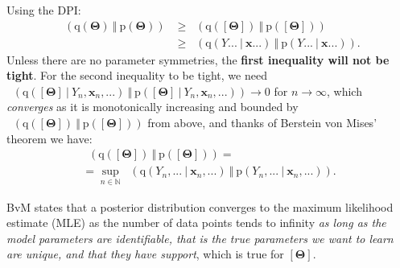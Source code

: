 \documentclass[25pt,a0paper,landscape]{tikzposter}
\newcommand{\MidSymbol}[1][]{\:#1\:}
\newcommand{\given}{\MidSymbol[\vert]}
\DeclareMathOperator{\opKale}{D_\mathrm{KL}}
\newcommand{\Kale}[2]{\opKale(#1 \MidSymbol[\Vert] #2)}
\newcommand{\opp}{\mathrm{p}}
\newcommand{\pof}[1]{\opp(#1)}
\newcommand{\opq}{\mathrm{q}}
\newcommand{\qof}[1]{\opq(#1)}
\newcommand{\W}{\boldsymbol{\Theta}}
\newcommand{\Dany}{\mathcal{D}}
\newcommand{\Y}{Y}
\newcommand{\x}{\boldsymbol{x}}
\begin{document}
\begin{columns}
{\begin{multicols}{2}
\begin{theorybox}[title=Consistency of Equivalence Classes with Bayesian Inference]
    \end{theorybox}
      \begin{tikzfigure}
      \end{tikzfigure}
    \begin{proofbox}[title=Equality in the Infinite Data Limit]
      Using the DPI:
      \begin{align*}
      \Kale{\qof{\W}}{\pof{\W}} &\ge \Kale{\qof{[\W]}}{\pof{[\W]}} \\
      &\ge \Kale{\qof{\Y...\given\x...}}{\pof{\Y...\given\x...}}.
      \end{align*}
      Unless there are no parameter symmetries, the \textbf{first inequality will not be tight}.
      For the second inequality to be tight, we need $\Kale{\qof{[\W] \given \Y_n,\x_n,...}}{\pof{[\W] \given \Y_n,\x_n,...}} \to 0$ for $n \to \infty$, which \emph{converges} as it is monotonically increasing and bounded by $\Kale{\qof{[\W]}}{\pof{[\W]}}$ from above, and thanks of Berstein von Mises' theorem we have:
      \begin{multline*}
      \Kale{\qof{[\W]}}{\pof{[\W]}} = \\
      = \sup_{n\in \mathbb{N}} \Kale{\qof{\Y_n,...\given\x_n,...}}{\pof{\Y_n,...\given\x_n,...}}.
      \end{multline*}
    \end{proofbox}
    \begin{theorybox}[title=Bernstein von Mises' Theorem]
      BvM states that a posterior distribution converges to the maximum likelihood estimate (MLE) as the number of data points tends to infinity \emph{as long as the model parameters are identifiable, that is the true parameters we want to learn are unique, and that they have support}, which is true for $[\W]$. 

\end{theorybox}
\end{multicols}}
\end{columns}
\end{document}
